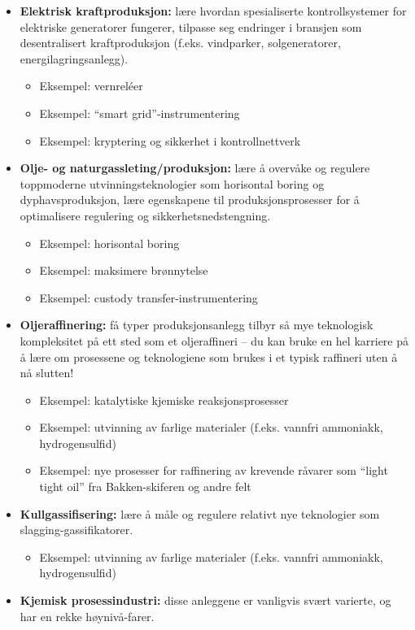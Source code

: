 \begin{itemize}
\item{} {\bf Elektrisk kraftproduksjon:} lære hvordan spesialiserte kontrollsystemer for elektriske generatorer fungerer, tilpasse seg endringer i bransjen som desentralisert kraftproduksjon (f.eks. vindparker, solgeneratorer, energilagringsanlegg).
\begin{itemize}

\item{} Eksempel: vernreléer
\item{} Eksempel: ``smart grid''-instrumentering
\item{} Eksempel: kryptering og sikkerhet i kontrollnettverk
\end{itemize}
\item{} {\bf Olje- og naturgassleting/produksjon:} lære å overvåke og regulere toppmoderne utvinningsteknologier som horisontal boring og dyphavsproduksjon, lære egenskapene til produksjonsprosesser for å optimalisere regulering og sikkerhetsnedstengning.
\begin{itemize}

\item{} Eksempel: horisontal boring
\item{} Eksempel: maksimere brønnytelse
\item{} Eksempel: custody transfer-instrumentering
\end{itemize}
\item{} {\bf Oljeraffinering:} få typer produksjonsanlegg tilbyr så mye teknologisk kompleksitet på ett sted som et oljeraffineri -- du kan bruke en hel karriere på å lære om prosessene og teknologiene som brukes i et typisk raffineri uten å nå slutten!
\begin{itemize}

\item{} Eksempel: katalytiske kjemiske reaksjonsprosesser
\item{} Eksempel: utvinning av farlige materialer (f.eks. vannfri ammoniakk, hydrogensulfid)
\item{} Eksempel: nye prosesser for raffinering av krevende råvarer som ``light tight oil'' fra Bakken-skiferen og andre felt
\end{itemize}
\item{} {\bf Kullgassifisering:} lære å måle og regulere relativt nye teknologier som slagging-gassifikatorer.
\begin{itemize}

\item{} Eksempel: utvinning av farlige materialer (f.eks. vannfri ammoniakk, hydrogensulfid)
\end{itemize}
\item{} {\bf Kjemisk prosessindustri:} disse anleggene er vanligvis svært varierte, og har en rekke høynivå-farer.
\begin{itemize}


\end{itemize}
\end{itemize}
